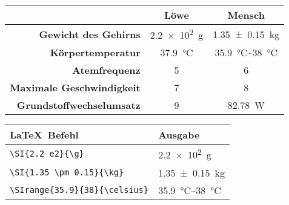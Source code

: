 \documentclass["WS\space 16-17\space -\space LaTeX-Kurs\space -\space Praesentation\space -\space 3.tex"]{subfiles}
\begin{document}
\begin{frame}[fragile]
	\Losung
	\begin{outputbox}
		\begin{center}
			\begin{tabular}{r|cc}
				\hline
				&	\textbf{Löwe}										& \textbf{Mensch} 						\\ \hline
				\textbf{Gewicht des Gehirns}		&	\SI{2.2 e2}{\g}										& \SI{1.35 \pm 0.15}{\kg}			\\ 
				\textbf{Körpertemperatur}			&	\SI{37.9}{\celsius}							& \SIrange{35.9}{38}{\degreeCelsius}	\\
				\textbf{Atemfrequenz}				&	5								& 6 					\\
				\textbf{Maximale Geschwindigkeit}	&	7								& 8				\\ 
				\textbf{Grundstoffwechselumsatz}	& 9	&  \SI{82.78}{\watt}\\
				\hline
			\end{tabular}
		\end{center}
	\end{outputbox}

				\begin{center}
		\begin{tabular}{ll}
			\toprule
			\LaTeX\ Befehl						&	Ausgabe						\\ \midrule
			\lstinline|\SI{2.2 e2}{\g} |			&	\SI{2.2 e2}{\g} 					\\
			\lstinline|\SI{1.35 \pm 0.15}{\kg}|		&	\SI{1.35 \pm 0.15}{\kg}			\\
			\lstinline|\SIrange{35.9}{38}{\celsius}|		&	\SIrange{35.9}{38}{\celsius}			\\
			\bottomrule
		\end{tabular}
	\end{center}
	
	
\end{frame}
\end{document}

